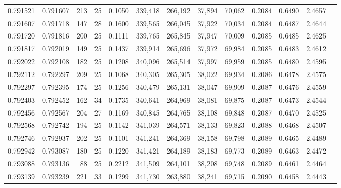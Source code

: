 \begin{tabular}{rrrrrrrrrrrrr}
0.791521 & 0.791607 &   213 &  25 &                                     0.1050 & 339,418 & 266,192 &  37,894 &  70,062 & 0.2084 & 0.6490 & 2.4657 \\
0.791607 & 0.791718 &   147 &  28 &                                     0.1600 & 339,565 & 266,045 &  37,922 &  70,034 & 0.2084 & 0.6487 & 2.4644 \\
0.791720 & 0.791816 &   200 &  25 &                                     0.1111 & 339,765 & 265,845 &  37,947 &  70,009 & 0.2085 & 0.6485 & 2.4625 \\
0.791817 & 0.792019 &   149 &  25 &                                     0.1437 & 339,914 & 265,696 &  37,972 &  69,984 & 0.2085 & 0.6483 & 2.4612 \\
0.792022 & 0.792108 &   182 &  25 &                                     0.1208 & 340,096 & 265,514 &  37,997 &  69,959 & 0.2085 & 0.6480 & 2.4595 \\
0.792112 & 0.792297 &   209 &  25 &                                     0.1068 & 340,305 & 265,305 &  38,022 &  69,934 & 0.2086 & 0.6478 & 2.4575 \\
0.792297 & 0.792395 &   174 &  25 &                                     0.1256 & 340,479 & 265,131 &  38,047 &  69,909 & 0.2087 & 0.6476 & 2.4559 \\
0.792403 & 0.792452 &   162 &  34 &                                     0.1735 & 340,641 & 264,969 &  38,081 &  69,875 & 0.2087 & 0.6473 & 2.4544 \\
0.792456 & 0.792567 &   204 &  27 &                                     0.1169 & 340,845 & 264,765 &  38,108 &  69,848 & 0.2087 & 0.6470 & 2.4525 \\
0.792568 & 0.792742 &   194 &  25 &                                     0.1142 & 341,039 & 264,571 &  38,133 &  69,823 & 0.2088 & 0.6468 & 2.4507 \\
0.792746 & 0.792937 &   202 &  25 &                                     0.1101 & 341,241 & 264,369 &  38,158 &  69,798 & 0.2089 & 0.6465 & 2.4489 \\
0.792942 & 0.793087 &   180 &  25 &                                     0.1220 & 341,421 & 264,189 &  38,183 &  69,773 & 0.2089 & 0.6463 & 2.4472 \\
0.793088 & 0.793136 &    88 &  25 &                                     0.2212 & 341,509 & 264,101 &  38,208 &  69,748 & 0.2089 & 0.6461 & 2.4464 \\
0.793139 & 0.793239 &   221 &  33 &                                     0.1299 & 341,730 & 263,880 &  38,241 &  69,715 & 0.2090 & 0.6458 & 2.4443 \\

\end{tabular}
